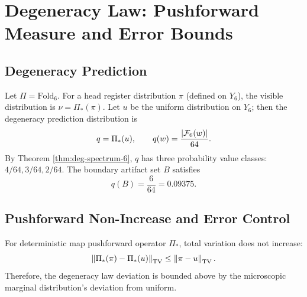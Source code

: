 \section{Degeneracy Law: Pushforward Measure and Error Bounds}

\subsection{Degeneracy Prediction}

Let $\Pi=\mathrm{Fold}_6$. For a head register distribution $\pi$ (defined on $Y_6$), the visible distribution is $\nu=\Pi_*(\pi)$. Let $u$ be the uniform distribution on $Y_6$; then the degeneracy prediction distribution is
\[
q=\Pi_*(u),\qquad q(w)=\frac{\left\lvert \mathcal{F}_6(w)\right\rvert}{64}.
\]
By Theorem \ref{thm:deg-spectrum-6}, $q$ has three probability value classes: $4/64,3/64,2/64$. The boundary artifact set $B$ satisfies
\[
q(B)=\frac{6}{64}=0.09375.
\]

\subsection{Pushforward Non-Increase and Error Control}

For deterministic map pushforward operator $\Pi_*$, total variation does not increase:
\[
\left\lVert \Pi_*(\pi)-\Pi_*(u)\right\rVert_{\mathrm{TV}}\le \left\lVert \pi-u\right\rVert_{\mathrm{TV}}.
\]
Therefore, the degeneracy law deviation is bounded above by the microscopic marginal distribution's deviation from uniform.

